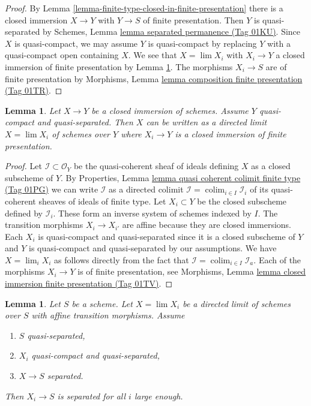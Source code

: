 \documentclass{amsart}
\theoremstyle{plain}
\newtheorem{lemma}[subsection]{Lemma}
\theoremstyle{definition}
\theoremstyle{remark}
\numberwithin{equation}{subsection}
\def\lim{\mathop{\mathrm{lim}}\nolimits}
\def\colim{\mathop{\mathrm{colim}}\nolimits}
\begin{document}
\begin{proof}
By Lemma \ref{lemma-finite-type-closed-in-finite-presentation}
there is a closed immersion $X \to Y$ with $Y \to S$ of
finite presentation. Then $Y$ is quasi-separated by
Schemes, Lemma \href{https://stacks.math.columbia.edu/tag/01KU}{lemma separated permanence (Tag 01KU)}.
Since $X$ is quasi-compact, we may assume
$Y$ is quasi-compact by replacing $Y$ with a quasi-compact open
containing $X$. We see that $X = \lim X_i$ with $X_i \to Y$ a closed
immersion of finite presentation by
Lemma \ref{lemma-closed-is-limit-closed-and-finite-presentation}.
The morphisms $X_i \to S$ are of finite presentation by
Morphisms, Lemma \href{https://stacks.math.columbia.edu/tag/01TR}{lemma composition finite presentation (Tag 01TR)}.
\end{proof}


\begin{lemma}
\label{lemma-closed-is-limit-closed-and-finite-presentation}
Let $X \to Y$ be a closed immersion of schemes. Assume $Y$ quasi-compact and
quasi-separated. Then $X$ can be written as a directed limit $X = \lim X_i$
of schemes over $Y$ where $X_i \to Y$ is a closed immersion
of finite presentation.
\end{lemma}

\begin{proof}
Let $\mathcal{I} \subset \mathcal{O}_Y$ be the quasi-coherent sheaf of
ideals defining $X$ as a closed subscheme of $Y$. By
Properties, Lemma \href{https://stacks.math.columbia.edu/tag/01PG}{lemma quasi coherent colimit finite type (Tag 01PG)}
we can write $\mathcal{I}$ as a directed colimit
$\mathcal{I} = \colim_{i \in I} \mathcal{I}_i$ of its
quasi-coherent sheaves of ideals of finite type.
Let $X_i \subset Y$ be the closed subscheme defined by $\mathcal{I}_i$.
These form an inverse system of schemes indexed by $I$.
The transition morphisms $X_i \to X_{i'}$ are affine because
they are closed immersions. Each $X_i$ is quasi-compact and quasi-separated
since it is a closed subscheme of $Y$ and $Y$ is quasi-compact and
quasi-separated by our assumptions.
We have $X = \lim_i X_i$ as follows directly from the
fact that $\mathcal{I} = \colim_{i \in I} \mathcal{I}_a$.
Each of the morphisms $X_i \to Y$ is of finite presentation, see
Morphisms, Lemma \href{https://stacks.math.columbia.edu/tag/01TV}{lemma closed immersion finite presentation (Tag 01TV)}.
\end{proof}


\begin{lemma}
\label{lemma-eventually-separated}
Let $S$ be a scheme. Let $X = \lim X_i$ be a directed
limit of schemes over $S$ with affine transition morphisms.
Assume
\begin{enumerate}
\item $S$ quasi-separated,
\item $X_i$ quasi-compact and quasi-separated,
\item $X \to S$ separated.
\end{enumerate}
Then $X_i \to S$ is separated for all $i$ large enough.
\end{lemma}
\end{document}
